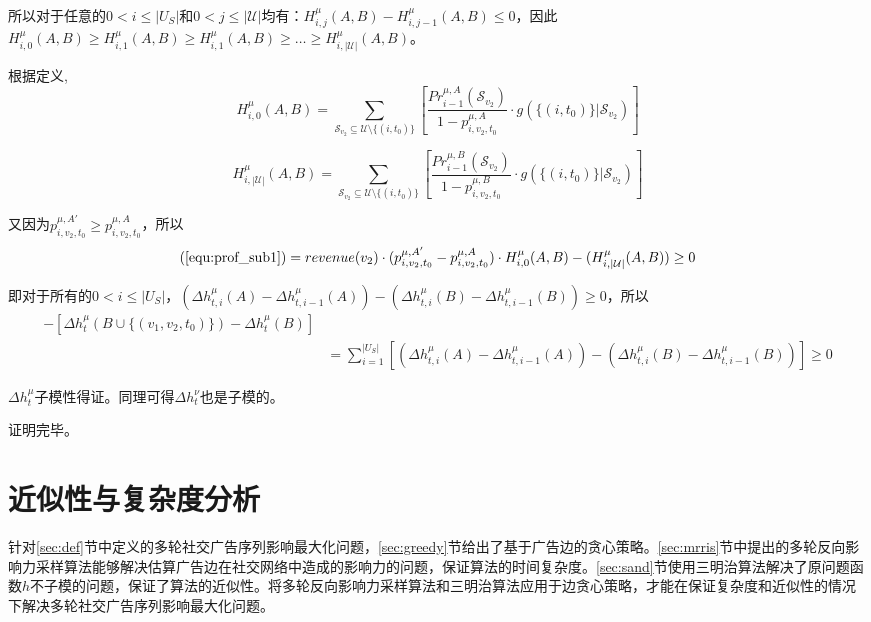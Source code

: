 所以对于任意的$0<i\le |U_S|$和$0<j\le |\mathcal{U}|$均有：$H_{i,j}^{\mu}(A,B)-H_{i,j-1}^{\mu}(A,B) \le 0$，因此$H_{i,0}^{\mu} (A,B)\ge H_{i,1}^{\mu}(A,B) \ge H_{i,1}^{\mu}(A,B) \ge \ldots \ge H_{i,|\mathcal{U}|}^{\mu}(A,B)$。

根据定义,
\begin{equation}
H_{i,0}^{\mu} (A,B)= \sum_{\mathcal{S}_{v_2}\subseteq \mathcal{U}\setminus \{(i,t_0)\}}\left[\frac{Pr_{i-1}^{\mu,A}(\mathcal{S}_{v_2})}{1-p_{i,v_2,t_0}^{\mu,A}} \cdot g(\{(i,t_0)\} |\mathcal{S}_{v_2})\right]
\end{equation}

\begin{equation}
H_{i,|\mathcal{U}|}^{\mu} (A,B)= \sum_{\mathcal{S}_{v_2}\subseteq \mathcal{U}\setminus \{(i,t_0)\}}\left[\frac{Pr_{i-1}^{\mu,B}(\mathcal{S}_{v_2})}{1-p_{i,v_2,t_0}^{\mu,B}} \cdot g(\{(i,t_0)\} |\mathcal{S}_{v_2})\right]
\end{equation}

又因为$p_{i,v_2,t_0}^{\mu,A'}\ge p_{i,v_2,t_0}^{\mu,A}$，所以
\begin{equation}
(\ref{equ:prof_sub1})=revenue(v_2)\cdot (p_{i,v_2,t_0}^{\mu,A'}-p_{i,v_2,t_0}^{\mu,A})\cdot H_{i,0}^{\mu}(A,B)-(H_{i,|\mathcal{U}|}^{\mu}(A,B)) \ge 0
\end{equation}

即对于所有的$0<i \le |U_S|$，$(\Delta h_{t,i}^{\mu}(A)-\Delta h_{t,i-1}^{\mu}(A)) - (\Delta h_{t,i}^{\mu}(B)-\Delta h_{t,i-1}^{\mu}(B)) \ge 0$，所以
\begin{align}
    [\Delta h_t^\mu(A \cup \{(v_1,v_2,t_0)\}&-\Delta h_t^\mu(A))]- [\Delta h_t^\mu(B\cup \{(v_1,v_2,t_0)\})-\Delta h_t^\mu(B)]\\ 
    &=\sum_{i=1}^{|U_S|}[(\Delta h_{t,i}^{\mu}(A)-\Delta h_{t,i-1}^{\mu}(A)) - (\Delta h_{t,i}^{\mu}(B)-\Delta h_{t,i-1}^{\mu}(B))] \ge 0
\end{align}

$\Delta h_t^\mu$子模性得证。同理可得$\Delta h_t^\nu$也是子模的。

\noindent 证明完毕。

\section{近似性与复杂度分析}
\label{sec:ana}

针对\ref{sec:def}节中定义的多轮社交广告序列影响最大化问题，\ref{sec:greedy}节给出了基于广告边的贪心策略。\ref{sec:mrris}节中提出的多轮反向影响力采样算法能够解决估算广告边在社交网络中造成的影响力的问题，保证算法的时间复杂度。\ref{sec:sand}节使用三明治算法解决了原问题函数$h$不子模的问题，保证了算法的近似性。将多轮反向影响力采样算法和三明治算法应用于边贪心策略，才能在保证复杂度和近似性的情况下解决多轮社交广告序列影响最大化问题。

